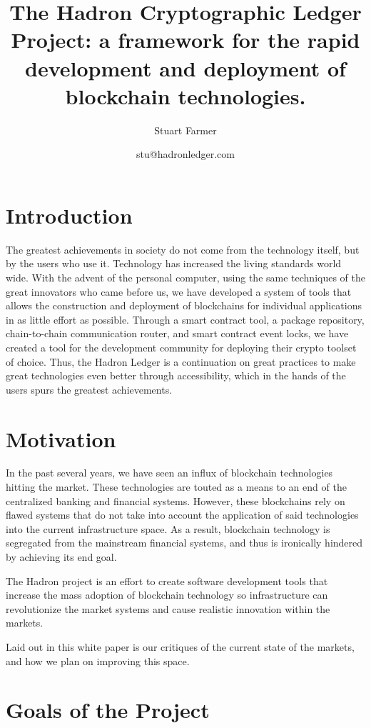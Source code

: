\documentclass{%
	article}
\title{The Hadron Cryptographic Ledger Project: a framework for the rapid development and deployment of blockchain technologies.}
\author{Stuart Farmer}
\date{stu@hadronledger.com}
\begin{document}
\sloppy
\maketitle

\section{Introduction}
The greatest achievements in society do not come from the technology itself, but by the users who use it. Technology has increased the living standards world wide. With the advent of the personal computer, using the same techniques of the great innovators who came before us, we have developed a system of tools that allows the construction and deployment of blockchains for individual applications in as little effort as possible. Through a smart contract tool, a package repository, chain-to-chain communication router, and smart contract event locks, we have created a tool for the development community for deploying their crypto toolset of choice. Thus, the Hadron Ledger is a continuation on great practices to make great technologies even better through accessibility, which in the hands of the users spurs the greatest achievements.

\section{Motivation}

In the past several years, we have seen an influx of blockchain technologies hitting the market. These technologies are touted as a means to an end of the centralized banking and financial systems. However, these blockchains rely on flawed systems that do not take into account the application of said technologies into the current infrastructure space. As a result, blockchain technology is segregated from the mainstream financial systems, and thus is ironically hindered by achieving its end goal.

The Hadron project is an effort to create software development tools that increase the mass adoption of blockchain technology so infrastructure can revolutionize the market systems and cause realistic innovation within the markets.

Laid out in this white paper is our critiques of the current state of the markets, and how we plan on improving this space.

\section{Goals of the Project}
\end{document}

